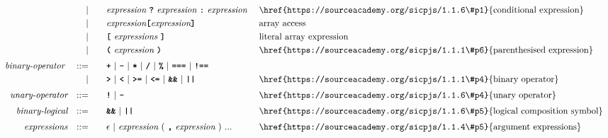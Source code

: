 \begin{alignat*}{9}
&&                       && |   &\quad &&   \textit{expression} \ \textbf{\texttt{?}}\ 
                                            \textit{expression}
                                            \ \textbf{\texttt{:}}\
                                            \textit{expression}\
                                                           && \textrm{\href{https://sourceacademy.org/sicpjs/1.1.6\#p1}{conditional expression}} \\
&&                       && |   &\quad && \textit{expression} \textbf{\texttt{[}}
                                          \textit{expression} \textbf{\texttt{]}}
                                                           && \textrm{array access} \\
&&                       && |   &\quad &&   \textbf{\texttt{[}}\ 
                                            \textit{expressions}\
                                            \textbf{\texttt{]}}
                                                           && \textrm{literal array expression}\\
&&                       && |   &\quad &&  \textbf{\texttt{(}}\  \textit{expression} \ 
                                            \textbf{\texttt{)}} && \textrm{\href{https://sourceacademy.org/sicpjs/1.1.1\#p6}{parenthesised expression}}\\[1mm]
&& \textit{binary-operator}    \ 
                        && ::= &\quad && \textbf{\texttt{+}}\ |\ \textbf{\texttt{-}}\ |\ \textbf{\texttt{*}}\ |\ \textbf{\texttt{/}}\ |\ \textbf{\texttt{\%}}\ |\ 
                                   \textbf{\texttt{===}}\ |\ \textbf{\texttt{!==}}\ \\
&&                       && |  &\quad &&  \texttt{\textbf{>}}\ |\ \texttt{\textbf{<}}\ |\ \texttt{\textbf{>=}}\ |\ \texttt{\textbf{<=}}\
                                          |\ \textbf{\texttt{\&\&}}\ |\ \texttt{\textbf{||}}
                                          && \textrm{\href{https://sourceacademy.org/sicpjs/1.1.1\#p4}{binary operator}}\\[1mm]
&& \textit{unary-operator}    
                        && ::= &\quad && \textbf{\texttt{!}}\ |\ \textbf{\texttt{-}}
                        && \textrm{\href{https://sourceacademy.org/sicpjs/1.1.6\#p4}{unary operator}}\\[1mm]       
&& \textit{binary-logical}   && ::=  &\quad &&  \textbf{\texttt{\&\&}}\ |\ \texttt{\textbf{||}}
                                          && \textrm{\href{https://sourceacademy.org/sicpjs/1.1.6\#p5}{logical composition symbol}}\\[1mm]
&& \textit{expressions}  && ::= &\quad && \epsilon\ | \ \textit{expression}\ (
                                                               \ \textbf{\texttt{,}} \
                                                                 \textit{expression} \ 
                                                                      )\ ...
                                                            && \textrm{\href{https://sourceacademy.org/sicpjs/1.1.4\#p5}{argument expressions}}
\end{alignat*}
